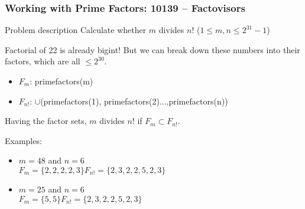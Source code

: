 \begin{frame}
  \frametitle{Working with Prime Factors: 10139 -- Factovisors}

  {\smaller
    \begin{block}{Problem description}
      Calculate whether $m$ divides $n!$ ($1 \leq m,n \leq 2^{31}-1$)
    \end{block}

    Factorial of 22 is already bigint! But we can break down these numbers into their
    factors, which are all $\leq 2^{30}$.

    \begin{itemize}
    \item $F_m$: primefactors(m)
    \item $F_{n!}$: $\cup$(primefactors(1), primefactors(2)...,primefactors(n))
    \end{itemize}

    Having the factor sets, $m$ divides $n!$ if $F_m \subset F_{n!}$.

    \bigskip

    Examples:
    \begin{itemize}
    \item $m = 48$ and $n=6$\\
      $F_m = \{2,2,2,2,3\} F_{n!} = \{2,3,2,2,5,2,3\}$

  \medskip

    \item $m = 25$ and $n = 6$\\
      $F_m = \{5,5\} F_{n!} = \{2,3,2,2,5,2,3\}$

    \end{itemize}
  }
\end{frame}


